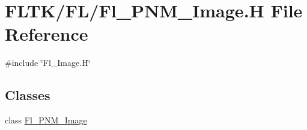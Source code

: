 \hypertarget{_fl___p_n_m___image_8_h}{}\section{F\+L\+T\+K/\+F\+L/\+Fl\+\_\+\+P\+N\+M\+\_\+\+Image.H File Reference}
\label{_fl___p_n_m___image_8_h}
{\ttfamily \#include \char`\"{}Fl\+\_\+\+Image.\+H\char`\"{}}\newline
\subsection*{Classes}
\begin{DoxyCompactItemize}
\item 
class \hyperlink{class_fl___p_n_m___image}{Fl\+\_\+\+P\+N\+M\+\_\+\+Image}
\end{DoxyCompactItemize}
